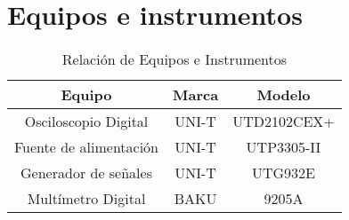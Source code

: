 
\section{Equipos e instrumentos}

\begin{table}[H]
    \centering
    \begin{tabular}{|c|c|c|}
        \hline
        \textbf{Equipo} & \textbf{Marca} & \textbf{Modelo} \\\hline
        Osciloscopio Digital & UNI-T & UTD2102CEX+ \\\hline
        Fuente de alimentación & UNI-T & UTP3305-II \\\hline
        Generador de señales & UNI-T & UTG932E \\\hline
        Multímetro Digital & BAKU & 9205A \\\hline
    \end{tabular}  
    \caption{Relación de Equipos e Instrumentos}
    \label{tab:equipos}
\end{table}
